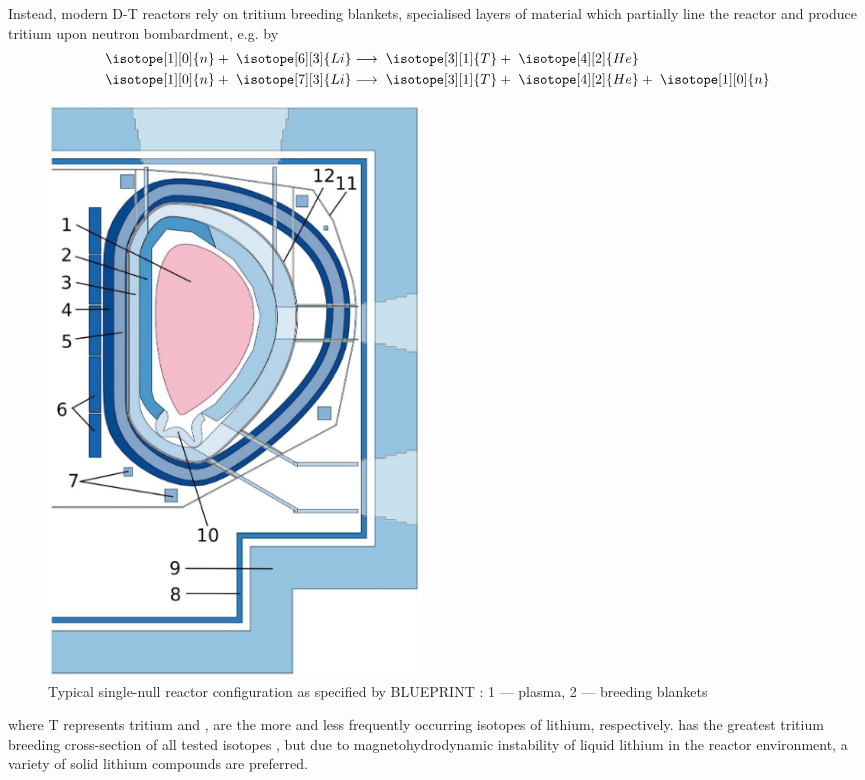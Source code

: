 Instead, modern D-T reactors rely on tritium breeding blankets, specialised
layers of material which partially line the reactor and produce tritium upon
neutron bombardment, e.g. by 
\begin{align}
	\isotope[1][0]{n} + \hspace{3pt} \isotope[6][3]{Li} 
	&\longrightarrow \hspace{3pt} 
	\isotope[3][1]{T} + \hspace{3pt}\isotope[4][2]{He} \\
	\isotope[1][0]{n} + \hspace{3pt} \isotope[7][3]{Li} 
	&\longrightarrow \hspace{3pt} 
	\isotope[3][1]{T} + \hspace{3pt} \isotope[4][2]{He} + \hspace{3pt} \isotope[1][0]{n}
\end{align}
\begin{figure}
  \vspace{-20pt}
  \begin{center}
    \includegraphics[width=0.48\textwidth]{fig1_tokamakdiagram.png}
  \end{center}
  \caption{Typical single-null reactor configuration as specified by BLUEPRINT \cite{Coleman2019}: 1 — plasma,
2 — breeding blankets }
\label{fig:tokamak}
\end{figure}
where T represents tritium and ,  are the more and
less frequently occurring isotopes of lithium, respectively.  has
the greatest tritium breeding cross-section of all tested isotopes \cite{Hernandez2018}, but due
to magnetohydrodynamic instability of liquid lithium in the reactor environment,
a variety of solid lithium compounds are preferred.

